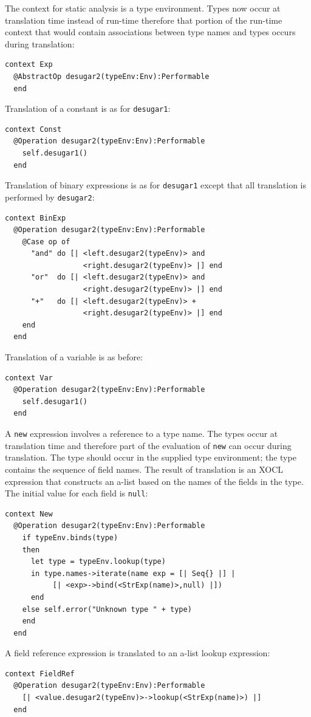 \documentclass{article}
\begin{document}
The context for static analysis is a type environment. Types now occur at translation time
instead of run-time therefore that portion of the run-time context that would contain
associations between type names and types occurs during translation:
\begin{verbatim}
context Exp
  @AbstractOp desugar2(typeEnv:Env):Performable
  end
\end{verbatim}
Translation of a constant is as for {\tt desugar1}:
\begin{verbatim}
context Const
  @Operation desugar2(typeEnv:Env):Performable
    self.desugar1()
  end
\end{verbatim}
Translation of binary expressions is as for {\tt desugar1} except that all translation
is performed by {\tt desugar2}:
\begin{verbatim}
context BinExp
  @Operation desugar2(typeEnv:Env):Performable
    @Case op of
      "and" do [| <left.desugar2(typeEnv)> and
                  <right.desugar2(typeEnv)> |] end
      "or"  do [| <left.desugar2(typeEnv)> and 
                  <right.desugar2(typeEnv)> |] end
      "+"   do [| <left.desugar2(typeEnv)> + 
                  <right.desugar2(typeEnv)> |] end
    end
  end
\end{verbatim}
Translation of a variable is as before:
\begin{verbatim}
context Var
  @Operation desugar2(typeEnv:Env):Performable
    self.desugar1()
  end
\end{verbatim}
A {\tt new} expression involves a reference to a type name. The types occur at translation time
and therefore part of the evaluation of {\tt new} can occur during translation. The type should
occur in the supplied type environment; the type contains the sequence of field names. The
result of translation is an XOCL expression that constructs an a-list based on the names of the 
fields in the type. The initial value for each field is {\tt null}:
\begin{verbatim}
context New
  @Operation desugar2(typeEnv:Env):Performable
    if typeEnv.binds(type)
    then
      let type = typeEnv.lookup(type)
      in type.names->iterate(name exp = [| Seq{} |] | 
           [| <exp>->bind(<StrExp(name)>,null) |])
      end
    else self.error("Unknown type " + type)
    end
  end
\end{verbatim}
A field reference expression is translated to an a-list lookup expression:
\begin{verbatim}
context FieldRef
  @Operation desugar2(typeEnv:Env):Performable
    [| <value.desugar2(typeEnv)>->lookup(<StrExp(name)>) |] 
  end
\end{verbatim}
\end{document}
